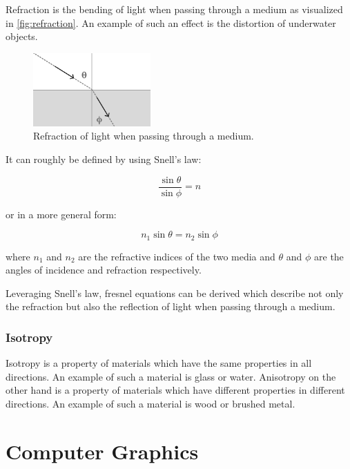 Refraction is the bending of light when passing through a medium as visualized in \autoref{fig:refraction}. An example of such an effect is the distortion of underwater objects.

\begin{figure}[H]
  \centering
  \includegraphics[width=0.4\textwidth]{resources/refraction.png}
  \caption{Refraction of light when passing through a medium.}
  \label{fig:refraction}
\end{figure}

It can roughly be defined by using Snell's law:

\begin{equation}
  \label{eqn:snells-law}
  \frac{\sin \theta}{\sin \phi} = n
\end{equation}

or in a more general form:

\begin{equation}
  \label{eqn:snells-law-general}
  n_1 \sin \theta = n_2 \sin \phi
\end{equation}

where $n_1$ and $n_2$ are the refractive indices of the two media and $\theta$ and $\phi$ are the angles of incidence and refraction respectively.

Leveraging Snell's law, fresnel equations can be derived which describe not only the refraction but also the reflection of light when passing through a medium.

\subsubsection{Isotropy}

Isotropy is a property of materials which have the same properties in all directions. An example of such a material is glass or water. Anisotropy on the other hand is a property of materials which have different properties in different directions. An example of such a material is wood or brushed metal. 

\section{Computer Graphics}
\label{ch:computerGraphics}


